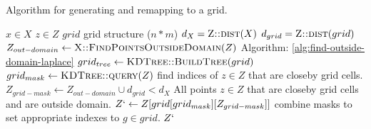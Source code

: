 \begin{algorithm}[H]
  \caption{Algorithm for generating and remapping to a grid.}
  \begin{algorithmic}
    \Require $x \in X$  
    \Require $z \in Z$ 
    \Require $grid$ \Comment grid structure ($n * m$)
    \State $d_{X} = \Call{Z::dist}{X}$ 
    \State $d_{grid} = \Call{Z::dist}{grid}$
    \State $Z_{out-domain} \gets \Call{X::FindPointsOutsideDomain}{Z}$ \Comment Algorithm: \ref{alg:find-outside-domain-laplace}
    \State $grid_{tree} \gets \Call{KDTree::BuildTree}{grid}$ 
    \State $grid_{mask} \gets \Call{KDTree::query}{Z}$ \Comment find indices of $z \in Z$ that are closeby grid cells.
    \State $Z_{grid-mask} \gets Z_{out-domain} \cup d_{grid} < d_{X}$ \Comment All points $z \in Z$ that are closeby grid cells and are outside domain.
    \State $Z` \gets Z[grid[grid_{mask}][Z_{grid-mask}]]$ \Comment combine masks to set appropriate indexes to $g \in grid$.
    \State \Return $Z`$
  \end{algorithmic}
  \label{alg:grid-remapping-laplace}
\end{algorithm}